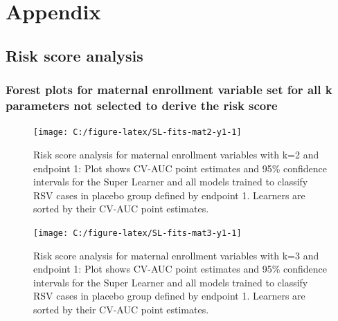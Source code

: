 \documentclass[11pt]{article}
\begin{document}
\clearpage

\hypertarget{appendix}{%
\section{Appendix}\label{appendix}}

\hypertarget{risk-score-analysis-1}{%
\subsection{Risk score analysis}\label{risk-score-analysis-1}}

\hypertarget{forest-plots-for-maternal-enrollment-variable-set-for-all-k-parameters-not-selected-to-derive-the-risk-score}{%
\subsubsection{Forest plots for maternal enrollment variable set for all k parameters not selected to derive the risk score}\label{forest-plots-for-maternal-enrollment-variable-set-for-all-k-parameters-not-selected-to-derive-the-risk-score}}

\begin{figure}[H]

{\centering \texttt{[image: C:/figure-latex/SL-fits-mat2-y1-1]} 

}

\caption[Risk score analysis for maternal enrollment variables with k=2 and endpoint 1.]{\label{fig:riskscoreAppendix1}Risk score analysis for maternal enrollment variables with k=2 and endpoint 1: Plot shows CV-AUC point estimates and 95\% confidence intervals for the Super Learner and all models trained to classify RSV cases in placebo group defined by endpoint 1. Learners are sorted by their CV-AUC point estimates.}\label{fig:SL-fits-mat2-y1}
\end{figure}

\begin{figure}[H]

{\centering \texttt{[image: C:/figure-latex/SL-fits-mat3-y1-1]} 

}

\caption[Risk score analysis for maternal enrollment variables with k=3 and endpoint 1.]{Risk score analysis for maternal enrollment variables with k=3 and endpoint 1: Plot shows CV-AUC point estimates and 95\% confidence intervals for the Super Learner and all models trained to classify RSV cases in placebo group defined by endpoint 1. Learners are sorted by their CV-AUC point estimates.}\label{fig:SL-fits-mat3-y1}
\end{figure}
\end{document}
